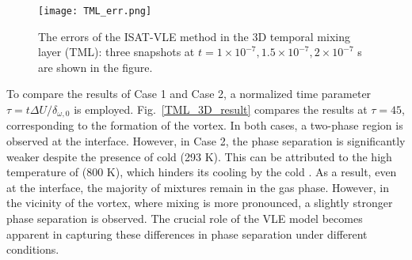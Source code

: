 \begin{figure}[htbp]
\centering
\texttt{[image: TML\_err.png]}
\caption{The errors of the ISAT-VLE method in the 3D temporal mixing layer (TML): three snapshots at $t = 1\times 10^{-7}, 1.5 \times 10^{-7}, 2\times 10^{-7}$ s are shown in the figure.}
\label{TML_3D_err} 
\end{figure}


To compare the results of Case 1 and Case 2, a normalized time parameter $\tau = t \Delta U/ \delta_{\omega,0}$  is employed. Fig.~\ref{TML_3D_result} compares the results at $\tau = 45$, corresponding to the formation of the vortex. In both cases, a two-phase region is observed at the interface. However, in Case 2, the phase separation is significantly weaker despite the presence of cold  (293 K). This can be attributed to the high temperature of  (800 K), which hinders its cooling by the cold .  As a result, even at the interface, the majority of mixtures remain in the gas phase. However, in the vicinity of the vortex, where mixing is more pronounced, a slightly stronger phase separation is observed. The crucial role of the VLE model becomes apparent in capturing these differences in phase separation under different conditions.


